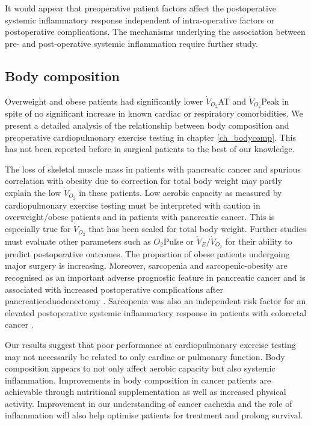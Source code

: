 It would appear that preoperative patient factors affect the postoperative systemic inflammatory response independent of intra-operative factors or postoperative complications. 
The mechanisms underlying the association between pre- and post-operative systemic inflammation require further study.

\subsection{Body composition}
Overweight and obese patients had significantly lower $\dot{V}_{O_2}$AT and $\dot{V}_{O_2}$Peak in spite of no significant increase in known cardiac or respiratory comorbidities. 
We present a detailed analysis of the relationship between body composition and preoperative cardiopulmonary exercise testing in chapter \ref{ch_bodycomp}.
This has not been reported before in surgical patients to the best of our knowledge. 

The loss of skeletal muscle mass in patients with pancreatic cancer and spurious correlation with obesity due to correction for total body weight may partly explain the low $\dot{V}_{O_2}$ in these patients. 
Low aerobic capacity as measured by cardiopulmonary exercise testing must be interpreted with caution in overweight/obese patients and in patients with pancreatic cancer. 
This is especially true for $\dot{V}_{O_2}$ that has been scaled for total body weight.
Further studies must evaluate other parameters such as $O_2$Pulse or $\dot{V}_E/\dot{V}_{O_2}$ for their ability to predict postoperative outcomes. 
The proportion of obese patients undergoing major surgery is increasing. 
Moreover, sarcopenia and sarcopenic-obesity are recognised as an important adverse prognostic feature in pancreatic cancer \parencite{tan_sarcopenia_2009, peng_impact_2012} and is associated with increased postoperative complications after pancreaticoduodenectomy \parencite{joglekar_sarcopenia_2015, pausch_cachexia_2012}.
Sarcopenia was also an independent risk factor for an elevated postoperative systemic inflammatory response in patients with colorectal cancer \parencite{reisinger_sarcopenia_2015}.

Our results suggest that poor performance at cardiopulmonary exercise testing may not necessarily be related to only cardiac or pulmonary function. 
Body composition appears to not only affect aerobic capacity but also systemic inflammation.
Improvements in body composition in cancer patients are achievable through nutritional supplementation \parencite{machado_whey_2015} as well as increased physical activity.
Improvement in our understanding of cancer cachexia and the role of inflammation will also help optimise patients for treatment and prolong survival.


